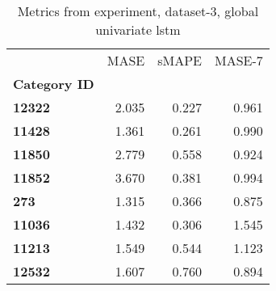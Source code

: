 \begin{table}[h]
\centering
\caption{Metrics from experiment, dataset-3, global univariate lstm}
\label{table:global-univariate-lstm-dataset-3}
\begin{tabular}{lrrr}
\toprule
{} &   MASE &  sMAPE &  MASE-7 \\
\textbf{Category ID} &        &        &         \\
\midrule
\textbf{12322      } &  2.035 &  0.227 &   0.961 \\
\textbf{11428      } &  1.361 &  0.261 &   0.990 \\
\textbf{11850      } &  2.779 &  0.558 &   0.924 \\
\textbf{11852      } &  3.670 &  0.381 &   0.994 \\
\textbf{273        } &  1.315 &  0.366 &   0.875 \\
\textbf{11036      } &  1.432 &  0.306 &   1.545 \\
\textbf{11213      } &  1.549 &  0.544 &   1.123 \\
\textbf{12532      } &  1.607 &  0.760 &   0.894 \\
\bottomrule
\end{tabular}
\end{table}
